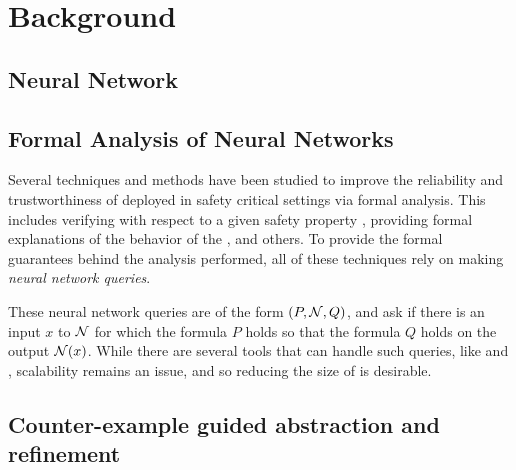 \section{Background}
\subsection{Neural Network}

\subsection{ Formal Analysis of Neural Networks }

Several techniques and methods have been studied to improve the reliability and
trustworthiness of \dnn deployed in safety critical settings via formal
analysis. This includes verifying \dnn with respect to a given
safety property \cite{reluplex, cegar-nn, deeppoly, cegarette, cleverest-nn,
conv-abs-gk, deep-abstract, lin-comb-abs-jan}, providing formal explanations of
the behavior of the \dnn \cite{minimal-image-fxai, overview-fxai}, and others.
 To provide the
formal guarantees behind the analysis performed, all of these techniques rely on
making \textit{neural network queries}. 

These neural network queries are of the form $(P, \mathcal{N}, Q)$, and ask if
there is an input $x$ to $\mathcal{N}$ for which the formula $P$ holds so that
the formula $Q$ holds on the output $\mathcal{N}(x)$. While there are several
tools that can handle such queries, like \marabou and \abcrown, scalability
remains an issue, and so reducing the size of \cnc is desirable.

\subsection{Counter-example guided abstraction and refinement}

